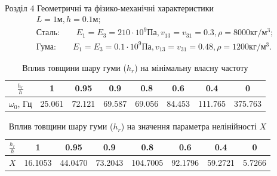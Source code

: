\documentclass[8pt]{beamer}
\numberwithin{figure}{section}
\numberwithin{equation}{section}
\numberwithin{table}{section}
\begin{document}
\begin{frame}{Розділ 4}
Геометричні та фізико-механічні характеристики
\begin{equation}
\begin{gathered}
L=1\text{м}, h=0.1\text{м};\\
\text{Сталь:}\qquad
E_1=E_3=210\cdot 10^{9} Па, v_{13}=v_{31}=0.3, \rho=8000 кг/м^3;\\
\text{Гума:}\qquad
E_1=E_3=0.1\cdot 10^{9} Па, v_{13}=v_{31}=0.48, \rho=1200 кг/м^3.
\end{gathered}
\end{equation}

\begin{table}[h!]
\caption{Вплив товщини шару гуми ($h_{r}$) на мінімальну власну частоту}
\centering
 \begin{tabular}{| c | c | c | c | c | c | c | c |} 
 \hline
 $\displaystyle \frac{h_{r}}{h}$ & 1 & 0.95 & 0.9 & 0.8 & 0.6 & 0.4 & 0 \\ 
  \hline
 $\omega_0$, Гц & 25.061 & 72.121 & 69.587 & 69.056 & 84.453 & 111.765 & 375.763 \\
   \hline
\end{tabular}
\end{table}

\begin{table}[h!]
\caption{Вплив товщини шару гуми ($h_{r}$) на значення параметра нелінійності $X$}
\centering
 \begin{tabular}{| c | c | c | c | c | c | c | c |} 
 \hline
 $\displaystyle \frac{h_{r}}{h}$ & 1 & 0.95 & 0.9 & 0.8 & 0.6 & 0.4 & 0 \\ 
  \hline
 $X$ & 16.1053 & 44.0470 & 73.2043 & 104.7005 & 92.1796 & 59.2721 & 5.7266 \\
   \hline
\end{tabular}
\end{table}

\end{frame}
\end{document}
